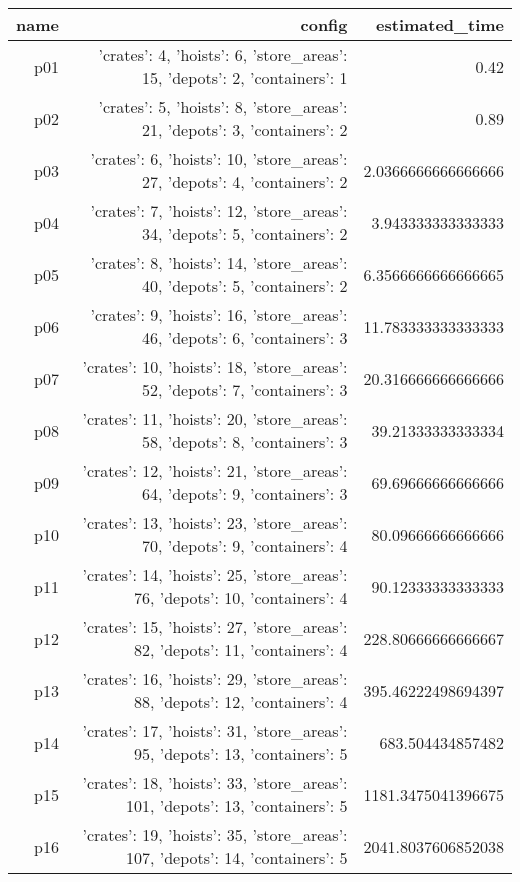 \documentclass{article}
\begin{document}
                            \begin{center}
                            \scriptsize
                            \begin{tabular}{r|r|r}
                            name & config & estimated\_time\\\midrule
                              p01&{'crates': 4, 'hoists': 6, 'store\_areas': 15, 'depots': 2, 'containers': 1}&0.42\\
  p02&{'crates': 5, 'hoists': 8, 'store\_areas': 21, 'depots': 3, 'containers': 2}&0.89\\
  p03&{'crates': 6, 'hoists': 10, 'store\_areas': 27, 'depots': 4, 'containers': 2}&2.0366666666666666\\
  p04&{'crates': 7, 'hoists': 12, 'store\_areas': 34, 'depots': 5, 'containers': 2}&3.943333333333333\\
  p05&{'crates': 8, 'hoists': 14, 'store\_areas': 40, 'depots': 5, 'containers': 2}&6.3566666666666665\\
  p06&{'crates': 9, 'hoists': 16, 'store\_areas': 46, 'depots': 6, 'containers': 3}&11.783333333333333\\
  p07&{'crates': 10, 'hoists': 18, 'store\_areas': 52, 'depots': 7, 'containers': 3}&20.316666666666666\\
  p08&{'crates': 11, 'hoists': 20, 'store\_areas': 58, 'depots': 8, 'containers': 3}&39.21333333333334\\
  p09&{'crates': 12, 'hoists': 21, 'store\_areas': 64, 'depots': 9, 'containers': 3}&69.69666666666666\\
  p10&{'crates': 13, 'hoists': 23, 'store\_areas': 70, 'depots': 9, 'containers': 4}&80.09666666666666\\
  p11&{'crates': 14, 'hoists': 25, 'store\_areas': 76, 'depots': 10, 'containers': 4}&90.12333333333333\\
  p12&{'crates': 15, 'hoists': 27, 'store\_areas': 82, 'depots': 11, 'containers': 4}&228.80666666666667\\
  p13&{'crates': 16, 'hoists': 29, 'store\_areas': 88, 'depots': 12, 'containers': 4}&395.46222498694397\\
  p14&{'crates': 17, 'hoists': 31, 'store\_areas': 95, 'depots': 13, 'containers': 5}&683.504434857482\\
  p15&{'crates': 18, 'hoists': 33, 'store\_areas': 101, 'depots': 13, 'containers': 5}&1181.3475041396675\\
  p16&{'crates': 19, 'hoists': 35, 'store\_areas': 107, 'depots': 14, 'containers': 5}&2041.8037606852038\\

\end{tabular}
\end{center}
\end{document}
